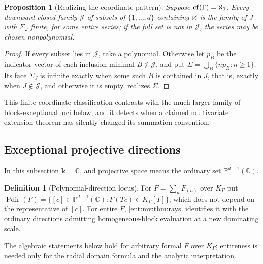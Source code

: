 \documentclass[11pt]{article}
\theoremstyle{plain}
\theoremstyle{plain}
\newtheorem{proposition}[proposition]{Proposition}
\theoremstyle{plain}
\theoremstyle{definition}
\newtheorem{definition}[definition]{Definition}
\theoremstyle{definition}
\theoremstyle{definition}
\theoremstyle{definition}
\theoremstyle{remark}
\newcommand{\C}{\mathbb C}\newcommand{\R}{\mathbb R}
\newcommand{\K}{K_\Gamma}\newcommand{\KD}{K_\Delta}
\newcommand{\kk}{\mathbf k}\newcommand{\PP}{\mathbb P}
\DeclareMathOperator{\Pdir}{Pdir}\DeclareMathOperator{\Adm}{Adm}
\begin{document}
\begin{proposition}[Realizing the coordinate pattern]
\label{ent:mv:prop:coordinate-realize}
Suppose $\operatorname{cf}(\Gamma)=\aleph_0$. Every downward-closed family $\mathcal J$ of
subsets of $\{1,\ldots,d\}$ containing $\varnothing$ is the family of $J$
with $\Sigma_J$ finite, for some entire series; if the full set is not in
$\mathcal J$, the series may be chosen nonpolynomial.
\end{proposition}
\begin{proof}
If every subset lies in $\mathcal J$, take a polynomial. Otherwise let $p_B$
be the indicator vector of each inclusion-minimal $B\notin\mathcal J$, and put
$\Sigma=\bigcup_B\{np_B:n\ge1\}$. Its face $\Sigma_J$ is infinite exactly when
some such $B$ is contained in $J$, that is, exactly when $J\notin\mathcal J$,
and otherwise it is empty.  realizes
$\Sigma$.
\end{proof}

This finite coordinate classification contrasts with the much larger family
of block-exceptional loci below, and it detects when a claimed multivariate
extension theorem has silently changed its summation convention.

\subsection{Exceptional projective directions}
\label{ent:mv:subsec:exceptional}
In this subsection $\kk=\C$, and projective space means the ordinary set
$\PP^{d-1}(\C)$.

\begin{definition}[Polynomial-direction locus]\label{ent:mv:def:pdir}
For $F=\sum_nF_{(n)}$ over $\K$ put
$\Pdir(F)=\{[c]\in\PP^{d-1}(\C):F(Tc)\in\K[T]\}$, which does not depend on
the representative of $[c]$. For entire $F$, \cref{ent:mv:thm:rays}
identifies it with the ordinary directions admitting homogeneous-block
evaluation at a new dominating scale.
\end{definition}

The algebraic statements below hold for arbitrary formal $F$ over $\K$;
entireness is needed only for the radial domain formula and the analytic
interpretation.
\end{document}
